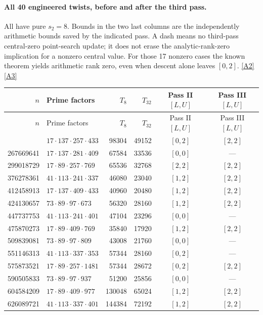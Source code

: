 \documentclass[11pt]{article}
\newcommand{\srcref}[1]{\hyperlink{source:#1}{[#1]}}
\begin{document}
\paragraph{All 40 engineered twists, before and after the third pass.}
All have pure $s_2=8$. Bounds in the two last columns are the independently
arithmetic bounds saved by the indicated pass. A dash means no third-pass
central-zero point-search update; it does not erase the analytic-rank-zero
implication for a nonzero central value. For those 17 nonzero cases the known
theorem yields arithmetic rank zero, even when descent alone leaves $[0,2]$.
\srcref{A2}\srcref{A3}
\begingroup\footnotesize
\setlength{\tabcolsep}{3pt}
\begin{longtable}{r l r r c c}
\toprule
$n$ & Prime factors & $T_8$ & $T_{32}$ & Pass II $[L,U]$ & Pass III $[L,U]$\\
\midrule\endfirsthead
\toprule
$n$ & Prime factors & $T_8$ & $T_{32}$ & Pass II $[L,U]$ & Pass III $[L,U]$\\
\midrule\endhead
\bottomrule\endfoot
259173449 & $17\cdot137\cdot257\cdot433$ & 98304 & 49152 & $[0,2]$ & $[2,2]$\\
267669641 & $17\cdot137\cdot281\cdot409$ & 67584 & 33536 & $[0,0]$ & ---\\
299018729 & $17\cdot89\cdot257\cdot769$ & 65536 & 32768 & $[2,2]$ & $[2,2]$\\
376278361 & $41\cdot113\cdot241\cdot337$ & 46080 & 23040 & $[1,2]$ & $[2,2]$\\
412458913 & $17\cdot137\cdot409\cdot433$ & 40960 & 20480 & $[1,2]$ & $[2,2]$\\
424130657 & $73\cdot89\cdot97\cdot673$ & 56320 & 28160 & $[1,2]$ & $[2,2]$\\
447737753 & $41\cdot113\cdot241\cdot401$ & 47104 & 23296 & $[0,0]$ & ---\\
475870273 & $17\cdot89\cdot409\cdot769$ & 35840 & 17920 & $[1,2]$ & $[2,2]$\\
509839081 & $73\cdot89\cdot97\cdot809$ & 43008 & 21760 & $[0,0]$ & ---\\
551146313 & $41\cdot113\cdot337\cdot353$ & 57344 & 28160 & $[0,2]$ & ---\\
575873521 & $17\cdot89\cdot257\cdot1481$ & 57344 & 28672 & $[0,2]$ & $[2,2]$\\
590505833 & $73\cdot89\cdot97\cdot937$ & 51200 & 25856 & $[0,0]$ & ---\\
604584209 & $17\cdot89\cdot409\cdot977$ & 130048 & 65024 & $[1,2]$ & $[2,2]$\\
626089721 & $41\cdot113\cdot337\cdot401$ & 144384 & 72192 & $[1,2]$ & $[2,2]$\\

\end{longtable}
\end{document}
